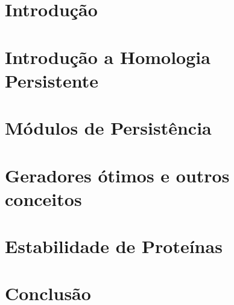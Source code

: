 \documentclass[mestrado, pre-defesa, draft]{packages/icmc}
\begin{document}
\textual

\chapter{Introdução}
\label{chapter:introducao}


\chapter{Introdução a Homologia Persistente}
\label{chapter:hp101}


\chapter{Módulos de Persistência}
\label{chapter:mph}


\chapter{Geradores ótimos e outros conceitos}
\label{chapter:miscel}


\chapter{Estabilidade de Proteínas}
\label{chapter:aplicacoes}


\chapter{Conclusão}
\label{chapter:conclusao}



%

\postextual



\end{document}
